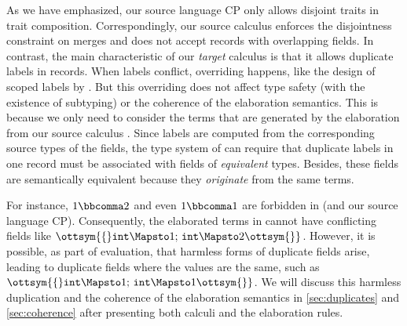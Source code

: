 As we have emphasized, our source language CP only allows disjoint traits in
trait composition. Correspondingly, our source calculus \lambdaiplus enforces
the disjointness constraint on merges and does not accept records with
overlapping fields. In contrast, the main characteristic of our \emph{target}
calculus \lambdar is that it allows duplicate labels in records. When labels
conflict, overriding happens, like the design of scoped labels by
\citet{leijen2005extensible}. But this overriding does not affect type safety
(with the existence of subtyping) or the coherence of the elaboration semantics.
This is because we only need to consider the terms that are generated by the
elaboration from our source calculus \lambdaiplus. Since labels are computed
from the corresponding source types of the fields, the type system of \lambdar
can require that duplicate labels in one record must be associated with fields
of \emph{equivalent} types. Besides, these fields are semantically equivalent
because they \emph{originate} from the same terms.

For instance, $1  \bbcomma  2$ and even $1  \bbcomma  1$ are forbidden in \lambdaiplus (and
our source language CP). Consequently, the elaborated terms in \lambdar cannot
have conflicting fields like $\ottsym{\{}   \mathtt{int}   \Mapsto  1  ; \,   \mathtt{int}   \Mapsto  2  \ottsym{\}}$. However, it is possible,
as part of evaluation, that harmless forms of duplicate fields arise, leading to
duplicate fields where the values are the same, such as $\ottsym{\{}   \mathtt{int}   \Mapsto  1  ; \,   \mathtt{int}   \Mapsto  1  \ottsym{\}}$.
We will discuss this harmless duplication and the coherence of the elaboration
semantics in \autoref{sec:duplicates} and \autoref{sec:coherence} after
presenting both calculi and the elaboration rules.

